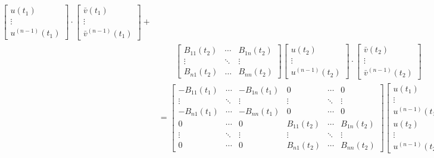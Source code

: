 \documentclass[11pt, oneside, a4paper]{article}
\begin{document}
\begin{equation}
\begin{split}
\begin{bmatrix}
    u(t_1)\\
    \vdots\\
    u^{(n-1)}(t_1)
    \end{bmatrix}\cdot 
    \begin{bmatrix}
        \bar{v}(t_1)\\
        \vdots\\
        \bar{v}^{(n-1)}(t_1)
    \end{bmatrix} + \\
    &\qquad \begin{bmatrix}
        B_{11}(t_2) & \cdots & B_{1n}(t_2)\\
        \vdots & \ddots & \vdots\\
        B_{n1}(t_2) & \ldots & B_{nn}(t_2)
    \end{bmatrix} 
    \begin{bmatrix}
    u(t_2)\\
    \vdots\\
    u^{(n-1)}(t_2)
    \end{bmatrix}\cdot 
    \begin{bmatrix}
        \bar{v}(t_2)\\
        \vdots\\
        \bar{v}^{(n-1)}(t_2)
    \end{bmatrix}\\
    &= \begin{bmatrix}
        -B_{11}(t_1) & \cdots & -B_{1n}(t_1) & 0 & \cdots & 0\\
        \vdots & \ddots & \vdots & \vdots & \ddots & \vdots\\
        -B_{n1}(t_1) & \cdots & -B_{nn}(t_1) & 0 & \cdots & 0\\
        0 & \cdots & 0 & B_{11}(t_2) & \cdots & B_{1n}(t_2)\\
        \vdots & \ddots & \vdots & \vdots & \ddots & \vdots\\
        0 & \cdots & 0 & B_{n1}(t_2) & \cdots & B_{nn}(t_2)
    \end{bmatrix} 
    \begin{bmatrix}
        u(t_1)\\
        \vdots\\
        u^{(n-1)}(t_1)\\
        u(t_2)\\
        \vdots\\
        u^{(n-1)}(t_2)
    \end{bmatrix}\cdot
    \begin{bmatrix}
        \bar{v}(t_1)\\

\end{bmatrix}
\end{split}
\end{equation}
\end{document}
